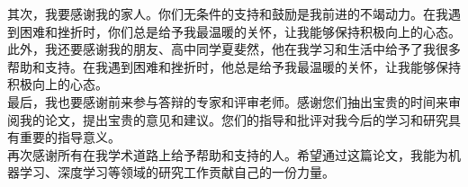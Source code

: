 \documentclass[12pt,a4paper]{amsart}
\begin{document}
其次，我要感谢我的家人。你们无条件的支持和鼓励是我前进的不竭动力。在我遇到困难和挫折时，你们总是给予我最温暖的关怀，让我能够保持积极向上的心态。\\

此外，我还要感谢我的朋友、高中同学夏斐然，他在我学习和生活中给予了我很多帮助和支持。在我遇到困难和挫折时，他总是给予我最温暖的关怀，让我能够保持积极向上的心态。\\

最后，我也要感谢前来参与答辩的专家和评审老师。感谢您们抽出宝贵的时间来审阅我的论文，提出宝贵的意见和建议。您们的指导和批评对我今后的学习和研究具有重要的指导意义。\\

再次感谢所有在我学术道路上给予帮助和支持的人。希望通过这篇论文，我能为机器学习、深度学习等领域的研究工作贡献自己的一份力量。

\appendix


{\footnotesize}
\end{document}
